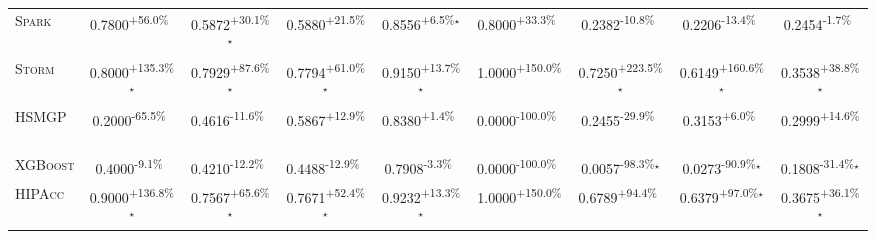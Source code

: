 \begin{table}[htbp]
\begin{tabular}{l|cccc|cccc}
\textsc{Spark} & \cellcolor{green!30}0.7800\textsuperscript{+56.0\%}$^{\,\,\,}$ & \cellcolor{green!30}0.5872\textsuperscript{+30.1\%}$^\star$ & \cellcolor{green!30}0.5880\textsuperscript{+21.5\%}$^{\,\,\,}$ & \cellcolor{green!30}0.8556\textsuperscript{+6.5\%}$^\star$ & \cellcolor{green!30}0.8000\textsuperscript{+33.3\%}$^{\,\,\,}$ & \cellcolor{red!30}0.2382\textsuperscript{-10.8\%}$^{\,\,\,}$ & \cellcolor{red!30}0.2206\textsuperscript{-13.4\%}$^{\,\,\,}$ & \cellcolor{red!30}0.2454\textsuperscript{-1.7\%}$^{\,\,\,}$ \\
\textsc{Storm} & \cellcolor{green!30}0.8000\textsuperscript{+135.3\%}$^\star$ & \cellcolor{green!30}0.7929\textsuperscript{+87.6\%}$^\star$ & \cellcolor{green!30}0.7794\textsuperscript{+61.0\%}$^\star$ & \cellcolor{green!30}0.9150\textsuperscript{+13.7\%}$^\star$ & \cellcolor{green!30}1.0000\textsuperscript{+150.0\%}$^{\,\,\,}$ & \cellcolor{green!30}0.7250\textsuperscript{+223.5\%}$^\star$ & \cellcolor{green!30}0.6149\textsuperscript{+160.6\%}$^\star$ & \cellcolor{green!30}0.3538\textsuperscript{+38.8\%}$^\star$ \\
\textsc{HSMGP} & \cellcolor{red!30}0.2000\textsuperscript{-65.5\%}$^{\,\,\,}$ & \cellcolor{red!30}0.4616\textsuperscript{-11.6\%}$^{\,\,\,}$ & \cellcolor{green!30}0.5867\textsuperscript{+12.9\%}$^{\,\,\,}$ & \cellcolor{green!30}0.8380\textsuperscript{+1.4\%}$^{\,\,\,}$ & \cellcolor{red!30}0.0000\textsuperscript{-100.0\%}$^{\,\,\,}$ & \cellcolor{red!30}0.2455\textsuperscript{-29.9\%}$^{\,\,\,}$ & \cellcolor{green!30}0.3153\textsuperscript{+6.0\%}$^{\,\,\,}$ & \cellcolor{green!30}0.2999\textsuperscript{+14.6\%}$^{\,\,\,}$ \\
\textsc{XGBoost} & \cellcolor{red!30}0.4000\textsuperscript{-9.1\%}$^{\,\,\,}$ & \cellcolor{red!30}0.4210\textsuperscript{-12.2\%}$^{\,\,\,}$ & \cellcolor{red!30}0.4488\textsuperscript{-12.9\%}$^{\,\,\,}$ & \cellcolor{red!30}0.7908\textsuperscript{-3.3\%}$^{\,\,\,}$ & \cellcolor{red!30}0.0000\textsuperscript{-100.0\%}$^{\,\,\,}$ & \cellcolor{red!30}0.0057\textsuperscript{-98.3\%}$^\star$ & \cellcolor{red!30}0.0273\textsuperscript{-90.9\%}$^\star$ & \cellcolor{red!30}0.1808\textsuperscript{-31.4\%}$^\star$ \\
\textsc{HIPAcc} & \cellcolor{green!30}0.9000\textsuperscript{+136.8\%}$^\star$ & \cellcolor{green!30}0.7567\textsuperscript{+65.6\%}$^\star$ & \cellcolor{green!30}0.7671\textsuperscript{+52.4\%}$^\star$ & \cellcolor{green!30}0.9232\textsuperscript{+13.3\%}$^\star$ & \cellcolor{green!30}1.0000\textsuperscript{+150.0\%}$^{\,\,\,}$ & \cellcolor{green!30}0.6789\textsuperscript{+94.4\%}$^{\,\,\,}$ & \cellcolor{green!30}0.6379\textsuperscript{+97.0\%}$^\star$ & \cellcolor{green!30}0.3675\textsuperscript{+36.1\%}$^\star$ \\

\end{tabular}
\end{table}
